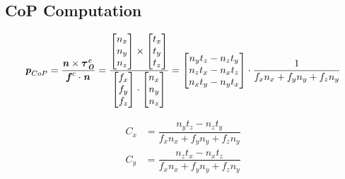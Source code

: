 \subsection{CoP Computation}
\begin{equation}
\bm{\mathit{p}}_{CoP}=\dfrac{\bm{\mathit{n}}\times\bm{\mathit{\bm{\mathit{\tau}}_O^c}}}{\bm{\mathit{f}}^c\cdot\bm{\mathit{n}}} = \dfrac{\begin{bmatrix} n_x \\ n_y \\ n_z \end{bmatrix} \times \begin{bmatrix} t_x \\ t_y \\ t_z \end{bmatrix}}{\begin{bmatrix} f_x \\ f_y \\ f_z \end{bmatrix} \cdot \begin{bmatrix} n_x \\ n_y \\ n_z \end{bmatrix}} = 
\begin{bmatrix} n_yt_z - n_zt_y \\ n_zt_x-n_xt_z \\ n_xt_y-n_yt_x \end{bmatrix}\cdot \dfrac{1}{f_xn_x+f_yn_y+f_zn_y}
\end{equation}

\begin{subequations}
\begin{align}
C_x&=\dfrac{n_yt_z - n_zt_y}{f_xn_x+f_yn_y+f_zn_y} \\
C_y&=\dfrac{n_zt_x-n_xt_z}{f_xn_x+f_yn_y+f_zn_y}
\end{align}
\end{subequations}

